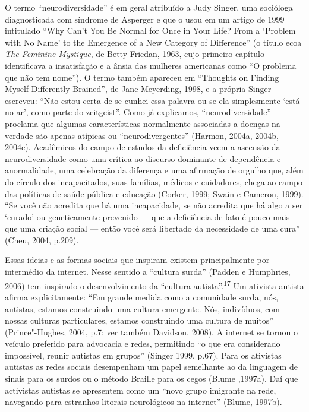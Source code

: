 O termo ``neurodiversidade'' é em geral atribuído a Judy Singer, uma
socióloga diagnosticada com síndrome de Asperger e que o usou em um
artigo de 1999 intitulado ``Why Can't You Be Normal for Once in Your
Life? From a `Problem with No Name' to the Emergence of a New Category
of Difference'' (o título ecoa \emph{The Feminine Mystique}, de Betty
Friedan, 1963, cujo primeiro capítulo identificava a insatisfação e a
ânsia das mulheres americanas como ``O problema que não tem nome''). O
termo também apareceu em ``Thoughts on Finding Myself Differently
Brained'', de Jane Meyerding, 1998, e a própria Singer escreveu: ``Não
estou certa de se cunhei essa palavra ou se ela simplesmente `está no
ar', como parte do zeitgeist''. Como já explicamos, ``neurodiversidade''
proclama que algumas características normalmente associadas a doenças na
verdade são apenas atípicas ou ``neurodivergentes'' (Harmon, 2004a,
2004b, 2004c). Acadêmicos do campo de estudos da deficiência veem a
ascensão da neurodiversidade como uma crítica ao discurso dominante de
dependência e anormalidade, uma celebração da diferença e uma afirmação
de orgulho que, além do círculo dos incapacitados, suas famílias,
médicos e cuidadores, chega ao campo das políticas de saúde pública e
educação (Corker, 1999; Swain e Cameron, 1999). ``Se você não acredita
que há uma incapacidade, se não acredita que há algo a ser `curado' ou
geneticamente prevenido --- que a deficiência de fato é pouco mais que
uma criação social --- então você será libertado da necessidade de uma
cura'' (Cheu, 2004, p.209).

Essas ideias e as formas sociais que inspiram existem principalmente por
intermédio da internet. Nesse sentido a ``cultura surda'' (Padden e
Humphries, 2006) tem inspirado o desenvolvimento da ``cultura
autista''.\textsuperscript{17} Um ativista autista afirma
explicitamente: ``Em grande medida como a comunidade surda, nós,
autistas, estamos construindo uma cultura emergente. Nós, indivíduos,
com nossas culturas particulares, estamos construindo uma cultura de
muitos'' (Prince"-Hughes, 2004, p.7; ver também Davidson, 2008). A
internet se tornou o veículo preferido para advocacia e redes,
permitindo ``o que era considerado impossível, reunir autistas em
grupos'' (Singer 1999, p.67). Para os ativistas autistas as redes
sociais desempenham um papel semelhante ao da linguagem de sinais para
os surdos ou o método Braille para os cegos (Blume ,1997a). Daí que
activistas autistas se apresentem como um ``novo grupo imigrante na
rede, navegando para estranhos litorais neurológicos na internet''
(Blume, 1997b).

